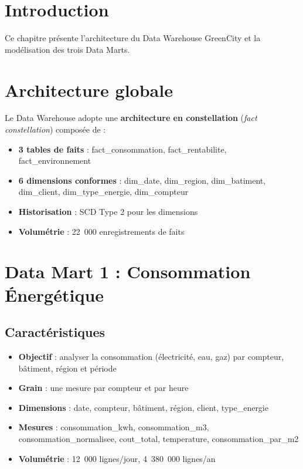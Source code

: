 \documentclass[12pt,a4paper]{report}
\begin{document}
\section{Introduction}

Ce chapitre présente l'architecture du Data Warehouse GreenCity et la modélisation des trois Data Marts.

\section{Architecture globale}

Le Data Warehouse adopte une \textbf{architecture en constellation} (\textit{fact constellation}) composée de :

\begin{itemize}
    \item \textbf{3 tables de faits} : fact\_consommation, fact\_rentabilite, fact\_environnement
    \item \textbf{6 dimensions conformes} : dim\_date, dim\_region, dim\_batiment, dim\_client, dim\_type\_energie, dim\_compteur
    \item \textbf{Historisation} : SCD Type 2 pour les dimensions
    \item \textbf{Volumétrie} : 22~000 enregistrements de faits
\end{itemize}

\section{Data Mart 1 : Consommation Énergétique}

\subsection{Caractéristiques}

\begin{itemize}
    \item \textbf{Objectif} : analyser la consommation (électricité, eau, gaz) par compteur, bâtiment, région et période
    \item \textbf{Grain} : une mesure par compteur et par heure
    \item \textbf{Dimensions} : date, compteur, bâtiment, région, client, type\_energie
    \item \textbf{Mesures} : consommation\_kwh, consommation\_m3, consommation\_normalisee, cout\_total, temperature, consommation\_par\_m2
    \item \textbf{Volumétrie} : 12~000 lignes/jour, 4~380~000 lignes/an
\end{itemize}
\end{document}
